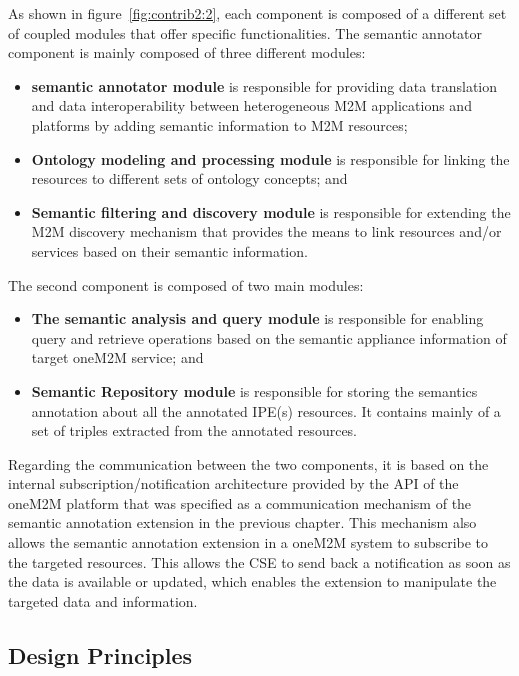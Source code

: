 As shown in figure~\ref{fig:contrib2:2}, each component is composed of a different set of coupled modules that offer specific functionalities. The semantic annotator component is mainly composed of three different modules:
\begin{itemize}
\item \textbf{semantic annotator module} is responsible for providing data translation and data interoperability between heterogeneous M2M applications and platforms by adding semantic information to M2M resources;
\item \textbf{Ontology modeling and processing module} is responsible for linking the resources to different sets of ontology concepts; and
\item \textbf{Semantic filtering and discovery module} is responsible for extending the M2M discovery mechanism that provides the means to link resources and/or services based on their semantic information.
\end{itemize}\par

The second component is composed of two main modules:
\begin{itemize}
\item \textbf{The semantic analysis and query module} is responsible for enabling query and retrieve operations based on the semantic appliance information of target oneM2M service; and
\item \textbf{Semantic Repository module} is responsible for storing the semantics annotation about all the annotated IPE(s) resources. It contains mainly of a set of triples extracted from the annotated resources.
\end{itemize}
Regarding the communication between the two components, it is based on the internal subscription/notification architecture provided by the API of the oneM2M platform that was specified as a communication mechanism of the semantic annotation extension in the previous chapter. This mechanism also allows the semantic annotation extension in a oneM2M system to subscribe to the targeted resources. This allows the CSE to send back a notification as soon as the data is available or updated, which enables the extension to manipulate the targeted data and information. \par


\subsection{Design Principles}

